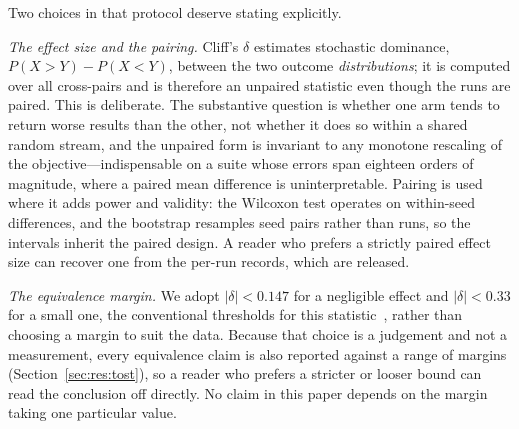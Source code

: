 Two choices in that protocol deserve stating explicitly.

\emph{The effect size and the pairing.} Cliff's $\delta$ estimates stochastic
dominance, $P(X{>}Y)-P(X{<}Y)$, between the two outcome \emph{distributions};
it is computed over all cross-pairs and is therefore an unpaired statistic
even though the runs are paired. This is deliberate. The substantive question
is whether one arm tends to return worse results than the other, not whether it
does so within a shared random stream, and the unpaired form is invariant to
any monotone rescaling of the objective---indispensable on a suite whose errors
span eighteen orders of magnitude, where a paired mean difference is
uninterpretable. Pairing is used where it adds power and validity: the Wilcoxon
test operates on within-seed differences, and the bootstrap resamples seed
pairs rather than runs, so the intervals inherit the paired design. A reader
who prefers a strictly paired effect size can recover one from the per-run
records, which are released.

\emph{The equivalence margin.} We adopt $|\delta|<0.147$ for a negligible
effect and $|\delta|<0.33$ for a small one, the conventional thresholds for
this statistic~\cite{romano2006exploring}, rather than choosing a margin to
suit the data. Because that choice is a judgement and not a measurement, every
equivalence claim is also reported against a range of margins
(Section~\ref{sec:res:tost}), so a reader who prefers a stricter or looser
bound can read the conclusion off directly. No claim in this paper depends on
the margin taking one particular value.
